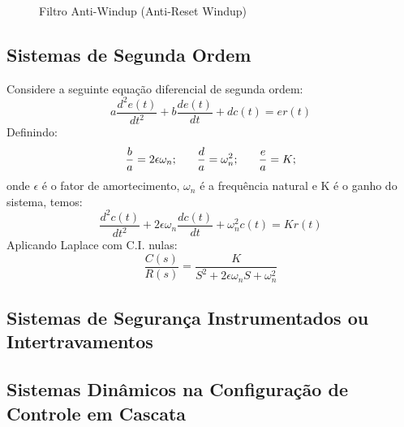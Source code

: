\begin{enumerate}
\begin{enumerate}
\begin{figure}[h]
                            \caption{Filtro Anti-Windup (Anti-Reset Windup)}
                            \label{fig:filtro_anti_windup}
                        \end{figure}
        \end{enumerate}
\end{enumerate}
\newpage

\subsection{Sistemas de Segunda Ordem}
\hspace{4ex}Considere a seguinte equação diferencial de segunda ordem:
    \[a\frac{d^2e(t)}{dt^2}+b\frac{de(t)}{dt}+dc(t)=er(t)\]
Definindo:
    \[\frac{b}{a}=2\epsilon\omega_n; \hspace{4ex} \frac{d}{a}=\omega^2_n; \hspace{4ex} \frac{e}{a}=K;\]
onde \(\epsilon\) é o fator de amortecimento, \(\omega_n\) é a frequência natural e K é o ganho do sistema, temos:
    \[\frac{d^2c(t)}{dt^2}+2\epsilon\omega_n\frac{dc(t)}{dt}+\omega_n^2c(t) = Kr(t)\]
Aplicando Laplace com C.I. nulas: 
    \[\frac{C(s)}{R(s)} = \frac{K}{S^2+2\epsilon\omega_nS+\omega_n^2}\]

\subsection{Sistemas de Segurança Instrumentados ou Intertravamentos}\hspace{4ex}

\subsection{Sistemas Dinâmicos na Configuração de Controle em Cascata}\hspace{4ex}